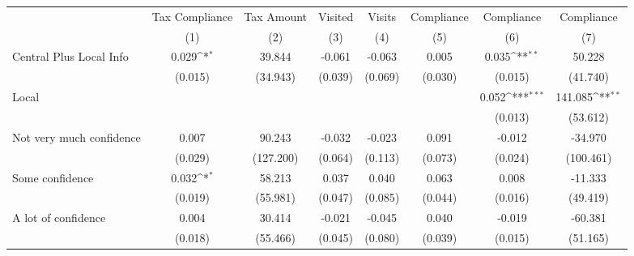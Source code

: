 {
\def\sym#1{\ifmmode^{#1}\else\(^{#1}\)\fi}
\begin{tabular}{l*{7}{c}}
\toprule
                &\multicolumn{1}{c}{Tax Compliance}&\multicolumn{1}{c}{Tax Amount}&\multicolumn{1}{c}{Visited}&\multicolumn{1}{c}{Visits}&\multicolumn{1}{c}{Compliance}&\multicolumn{1}{c}{Compliance}&\multicolumn{1}{c}{Compliance}\\
                &\multicolumn{1}{c}{(1)}         &\multicolumn{1}{c}{(2)}         &\multicolumn{1}{c}{(3)}         &\multicolumn{1}{c}{(4)}         &\multicolumn{1}{c}{(5)}         &\multicolumn{1}{c}{(6)}         &\multicolumn{1}{c}{(7)}         \\
\midrule
Central Plus Local Info&    0.029\sym{*}  &   39.844         &   -0.061         &   -0.063         &    0.005         &    0.035\sym{**} &   50.228         \\
                &  (0.015)         & (34.943)         &  (0.039)         &  (0.069)         &  (0.030)         &  (0.015)         & (41.740)         \\
Local           &                  &                  &                  &                  &                  &    0.052\sym{***}&  141.085\sym{**} \\
                &                  &                  &                  &                  &                  &  (0.013)         & (53.612)         \\
Not very much confidence&    0.007         &   90.243         &   -0.032         &   -0.023         &    0.091         &   -0.012         &  -34.970         \\
                &  (0.029)         &(127.200)         &  (0.064)         &  (0.113)         &  (0.073)         &  (0.024)         &(100.461)         \\
Some confidence &    0.032\sym{*}  &   58.213         &    0.037         &    0.040         &    0.063         &    0.008         &  -11.333         \\
                &  (0.019)         & (55.981)         &  (0.047)         &  (0.085)         &  (0.044)         &  (0.016)         & (49.419)         \\
A lot of confidence&    0.004         &   30.414         &   -0.021         &   -0.045         &    0.040         &   -0.019         &  -60.381         \\
                &  (0.018)         & (55.466)         &  (0.045)         &  (0.080)         &  (0.039)         &  (0.015)         & (51.165)         \\

\end{tabular}}
